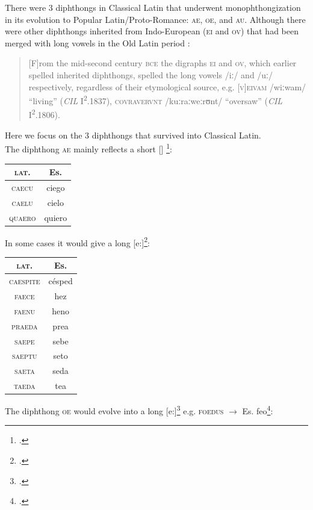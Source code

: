 \documentclass{report}[12pt]
\begin{document}
There were 3 diphthongs in Classical Latin that underwent monophthongization in its evolution to Popular Latin/Proto-Romance: \textsc{ae}, \textsc{oe}, and \textsc{au}. Although there were other diphthongs inherited from Indo-European (\textsc{ei} and \textsc{ov}) that had been merged with long vowels in the Old Latin period \parencite[p.~18]{companion_to_latin}:
\begin{quote}
  [F]rom the mid-second century \textsc{bce} the digraphs \textsc{ei} and \textsc{ov}, which earlier spelled inherited diphthongs, spelled the long vowels /iː/ and /uː/ respectively, regardless of their etymological source, e.g. \textsc{[v]eivam} /wiːwam/ ``living'' (\emph{CIL} I\textsuperscript{2}.1837), \textsc{covravervnt} /kuːraːweːrʊnt/ ``oversaw'' (\emph{CIL} I\textsuperscript{2}.1806).
\end{quote}
Here we focus on the 3 diphthongs that survived into Classical Latin. \\
The diphthong \textsc{ae} mainly reflects a short [] \footcite[p.~105]{lloyd_spanish}:
\begin{center}
\begin{tabular}{c c}
  \textsc{lat.} & Es. \\
  \hline
  \textsc{caecu} & ciego \\
  \textsc{caelu} & cielo \\
  \textsc{quaero} & quiero \\
\end{tabular}
\end{center}
In some cases it would give a long [e:]\footcite[p.~105]{lloyd_spanish}:
\begin{center}
\begin{tabular}{c c}
  \textsc{lat.} & Es. \\
  \hline
  \textsc{caespite} & c\'{e}sped \\
  \textsc{faece} & hez \\
  \textsc{faenu} & heno \\
  \textsc{praeda} & prea \\
  \textsc{saepe} & sebe \\
  \textsc{saeptu} & seto \\
  \textsc{saeta} & seda \\
  \textsc{taeda} & tea \\
\end{tabular}
\end{center}
The diphthong \textsc{oe} would evolve into a long [e:]\footcite[p.~106]{lloyd_spanish} e.g. \textsc{foedus} $\rightarrow$ Es. feo\footcite[p.~23]{romance_his}:
\end{document}

